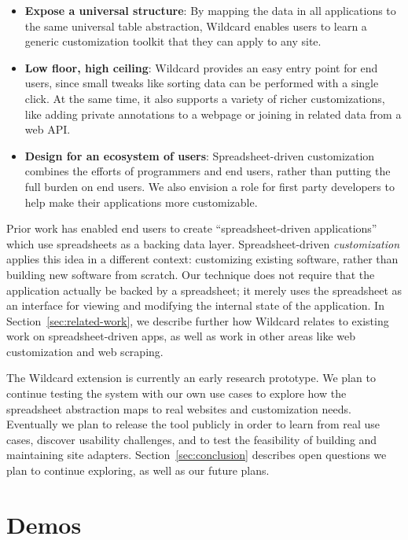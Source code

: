 \documentclass[english]{programming}
\providecommand{\tightlist}{%
  \setlength{\itemsep}{0pt}\setlength{\parskip}{0pt}}
\begin{document}
\begin{itemize}
\tightlist
\item
  \textbf{Expose a universal structure}: By mapping the data in all
  applications to the same universal table abstraction, Wildcard enables
  users to learn a generic customization toolkit that they can apply to
  any site.
\item
  \textbf{Low floor, high ceiling}: Wildcard provides an easy entry
  point for end users, since small tweaks like sorting data can be
  performed with a single click. At the same time, it also supports a
  variety of richer customizations, like adding private annotations to a
  webpage or joining in related data from a web API.
\item
  \textbf{Design for an ecosystem of users}: Spreadsheet-driven
  customization combines the efforts of programmers and end users,
  rather than putting the full burden on end users. We also envision a
  role for first party developers to help make their applications more
  customizable.
\end{itemize}

Prior work \autocite{mccutchen2016,benson2014,chang2014} has enabled end
users to create ``spreadsheet-driven applications'' which use
spreadsheets as a backing data layer. Spreadsheet-driven
\emph{customization} applies this idea in a different context:
customizing existing software, rather than building new software from
scratch. Our technique does not require that the application actually be
backed by a spreadsheet; it merely uses the spreadsheet as an interface
for viewing and modifying the internal state of the application. In
Section~\ref{sec:related-work}, we describe further how Wildcard relates
to existing work on spreadsheet-driven apps, as well as work in other
areas like web customization and web scraping.

The Wildcard extension is currently an early research prototype. We plan
to continue testing the system with our own use cases to explore how the
spreadsheet abstraction maps to real websites and customization needs.
Eventually we plan to release the tool publicly in order to learn from
real use cases, discover usability challenges, and to test the
feasibility of building and maintaining site adapters.
Section~\ref{sec:conclusion} describes open questions we plan to
continue exploring, as well as our future plans.

\hypertarget{sec:demos}{%
\section{Demos}\label{sec:demos}}
\end{document}
